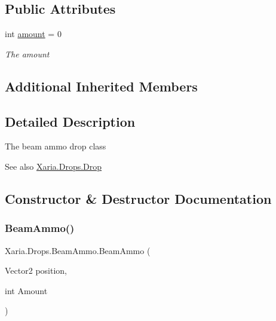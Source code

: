\subsection*{Public Attributes}
\begin{DoxyCompactItemize}
\item 
int \hyperlink{classXaria_1_1Drops_1_1BeamAmmo_a8f2fd61fca6d287feaee375834a5fe15}{amount} = 0
\begin{DoxyCompactList}\small\item\em The amount \end{DoxyCompactList}\end{DoxyCompactItemize}
\subsection*{Additional Inherited Members}


\subsection{Detailed Description}
The beam ammo drop class 

\begin{DoxySeeAlso}{See also}
\hyperlink{classXaria_1_1Drops_1_1Drop}{Xaria.\+Drops.\+Drop}


\end{DoxySeeAlso}


\subsection{Constructor \& Destructor Documentation}
\mbox{\label{classXaria_1_1Drops_1_1BeamAmmo_abe0f6a09f4daab880e128767368db6f0}} 
\subsubsection{\texorpdfstring{Beam\+Ammo()}{BeamAmmo()}}
{\footnotesize\ttfamily Xaria.\+Drops.\+Beam\+Ammo.\+Beam\+Ammo (\begin{DoxyParamCaption}\item[{Vector2}]{position,  }\item[{int}]{Amount }\end{DoxyParamCaption})\hspace{0.3cm}{\ttfamily [inline]}}



